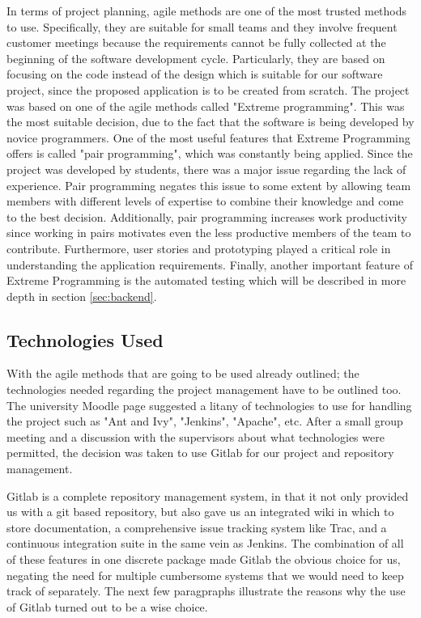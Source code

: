 \documentclass{l3proj}
\begin{document}
In terms of project planning, agile methods are one of the most trusted methods to use. Specifically, they are suitable for small teams and they involve frequent customer meetings because the requirements cannot be fully collected at the beginning of the software development cycle. Particularly, they are based on focusing on the code instead of the design which is suitable for our software project, since the proposed application is to be created from scratch. The project was based on one of the agile methods called "Extreme programming". This was the most suitable decision, due to the fact that the software is being developed by novice programmers. One of the most useful features that Extreme Programming offers is called "pair programming", which was constantly being applied. Since the project was developed by students, there was a major issue regarding the lack of experience. Pair programming negates this issue to some extent by allowing team members with different levels of expertise to combine their knowledge and come to the best decision. Additionally, pair programming increases work productivity since working in pairs motivates even the less productive members of the team to contribute. Furthermore, user stories and prototyping played a critical role in understanding the application requirements. Finally, another important feature of Extreme Programming is the automated testing which will be described in more depth in section \ref{sec:backend}.

\subsection{Technologies Used}
\label{tech}

With the agile methods that are going to be used already outlined; the technologies needed regarding the project management have to be outlined too. The university Moodle page suggested a litany of technologies to use for handling the project such as "Ant and Ivy", "Jenkins", "Apache", etc. After a small group meeting and a discussion with the supervisors about what technologies were permitted, the decision was taken to use Gitlab \cite{Gitlab} for our project and repository management. 

Gitlab is a complete repository management system, in that it not only provided us with a git based repository, but also gave us an integrated wiki in which to store documentation, a comprehensive issue tracking system like Trac, and a continuous integration suite in the same vein as Jenkins. The combination of all of these features in one discrete package made Gitlab the obvious choice for us, negating the need for multiple cumbersome systems that we would need to keep track of separately. The next few paragpraphs illustrate the reasons why the use of Gitlab turned out to be a wise choice.
\end{document}
